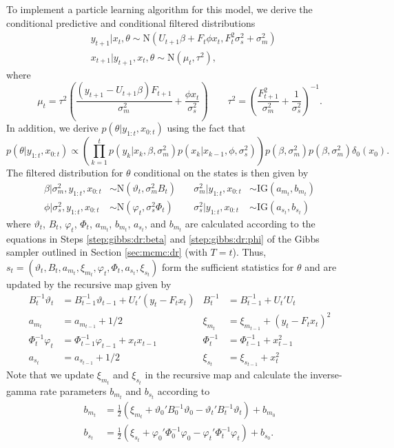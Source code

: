 To implement a particle learning algorithm for this model, we derive the conditional predictive and conditional filtered distributions
\begin{align}
&y_{t+1}|x_t,\theta \sim \mbox{N}(U_{t+1}\beta + F_t\phi x_t, F_t^2\sigma^2_s + \sigma^2_m) \label{eqn:pl:dr:pred} \\
&x_{t+1}|y_{t+1},x_t,\theta \sim \mbox{N}(\mu_t,\tau^2), \label{eqn:pl:dr:state}
\end{align}
where \[\mu_t = \tau^2\left(\frac{(y_{t+1}-U_{t+1}\beta)F_{t+1}}{\sigma^2_m} + \frac{\phi x_t}{\sigma^2_s}\right) \qquad \tau^2 = \left(\frac{F_{t+1}^2}{\sigma^2_m} + \frac{1}{\sigma^2_s}\right)^{-1}.\]
In addition, we derive $p(\theta|y_{1:t},x_{0:t})$ using the fact that
\begin{equation}
p(\theta|y_{1:t},x_{0:t}) \propto \left(\prod_{k=1}^t p(y_k|x_k,\beta,\sigma^2_m)p(x_k|x_{k-1},\phi,\sigma^2_s)\right)p(\beta,\sigma^2_m)p(\beta,\sigma^2_m)\delta_0(x_0). \label{eqn:pl:dr:theta}
\end{equation}
The filtered distribution for $\theta$ conditional on the states is then given by
\begin{align}
\beta|\sigma^2_m,y_{1:t},x_{0:t} &\sim \mbox{N}(\vartheta_t, \sigma^2_m B_t) &\quad \sigma^2_m|y_{1:t},x_{0:t} &\sim \mbox{IG}(a_{m_t},b_{m_t}) \label{eqn:pl:post:beta} \\
\phi|\sigma^2_s,y_{1:t},x_{0:t} &\sim \mbox{N}(\varphi_t, \sigma^2_s \Phi_t) &\quad \sigma^2_s|y_{1:t},x_{0:t} &\sim \mbox{IG}(a_{s_t},b_{s_t}) \label{eqn:pl:post:phi}
\end{align}
where $\vartheta_t$, $B_t$, $\varphi_t$, $\Phi_t$, $a_{m_t}$, $b_{m_t}$, $a_{s_t}$, and $b_{m_t}$ are calculated according to the equations in Steps \ref{step:gibbs:dr:beta} and \ref{step:gibbs:dr:phi} of the Gibbs sampler outlined in Section \ref{sec:mcmc:dr} (with $T = t$). Thus, $s_t = (\vartheta_t, B_t, a_{m_t}, \xi_{m_t}, \varphi_t, \Phi_t, a_{s_t}, \xi_{s_t})$ form the sufficient statistics for $\theta$ and are updated by the recursive map given by
\begin{align}
B_t^{-1}\vartheta_t &= B_{t-1}^{-1}\vartheta_{t-1} + U_t'(y_t - F_tx_t) & B_t^{-1} &= B_{t-1}^{-1} + U_t'U_t \label{eqn:pl:dr:suff} \\
a_{m_t} &= a_{m_{t-1}} + 1/2 & \xi_{m_t} &= \xi_{m_{t-1}} + (y_t - F_tx_t)^2 \nonumber \\
\Phi_t^{-1}\varphi_t &= \Phi_{t-1}^{-1}\varphi_{t-1} + x_tx_{t-1} & \Phi_t^{-1} &= \Phi_{t-1}^{-1} + x_{t-1}^2 \nonumber \\
a_{s_t} &= a_{s_{t-1}} + 1/2 & \xi_{s_t} &= \xi_{s_{t-1}} + x_t^2 \nonumber
\end{align}
Note that we update $\xi_{m_t}$ and $\xi_{s_t}$ in the recursive map and calculate the inverse-gamma rate parameters $b_{m_t}$ and $b_{s_t}$ according to
\begin{align}
b_{m_t} &= \frac{1}{2}\left(\xi_{m_t} + \vartheta_0'B_0^{-1}\vartheta_0 - \vartheta_t'B_t^{-1}\vartheta_t\right) + b_{m_0} \label{eqn:pl:dr:rate} \\
b_{s_t} &= \frac{1}{2}\left(\xi_{s_t} + \varphi_0'\Phi_0^{-1}\varphi_0 - \varphi_t'\Phi_t^{-1}\varphi_t\right) + b_{s_0}. \nonumber
\end{align}

